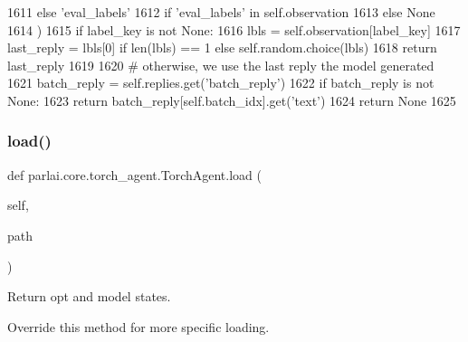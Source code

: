 \begin{DoxyCode}
1611                 \textcolor{keywordflow}{else} \textcolor{stringliteral}{'eval\_labels'}
1612                 \textcolor{keywordflow}{if} \textcolor{stringliteral}{'eval\_labels'} \textcolor{keywordflow}{in} self.observation
1613                 \textcolor{keywordflow}{else} \textcolor{keywordtype}{None}
1614             )
1615             \textcolor{keywordflow}{if} label\_key \textcolor{keywordflow}{is} \textcolor{keywordflow}{not} \textcolor{keywordtype}{None}:
1616                 lbls = self.observation[label\_key]
1617                 last\_reply = lbls[0] \textcolor{keywordflow}{if} len(lbls) == 1 \textcolor{keywordflow}{else} self.random.choice(lbls)
1618                 \textcolor{keywordflow}{return} last\_reply
1619 
1620         \textcolor{comment}{# otherwise, we use the last reply the model generated}
1621         batch\_reply = self.replies.get(\textcolor{stringliteral}{'batch\_reply'})
1622         \textcolor{keywordflow}{if} batch\_reply \textcolor{keywordflow}{is} \textcolor{keywordflow}{not} \textcolor{keywordtype}{None}:
1623             \textcolor{keywordflow}{return} batch\_reply[self.batch\_idx].get(\textcolor{stringliteral}{'text'})
1624         \textcolor{keywordflow}{return} \textcolor{keywordtype}{None}
1625 
\end{DoxyCode}
\mbox{\label{classparlai_1_1core_1_1torch__agent_1_1TorchAgent_af626fc7d32fc9b0dfeec167a52353baf}} 
\subsubsection{\texorpdfstring{load()}{load()}}
{\footnotesize\ttfamily def parlai.\+core.\+torch\+\_\+agent.\+Torch\+Agent.\+load (\begin{DoxyParamCaption}\item[{}]{self,  }\item[{}]{path }\end{DoxyParamCaption})}

\begin{DoxyVerb}Return opt and model states.

Override this method for more specific loading.
\end{DoxyVerb}
 

